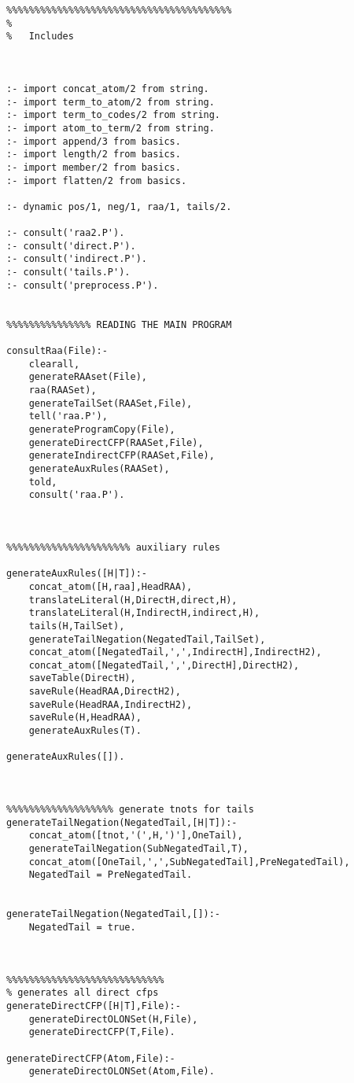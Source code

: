 \begin{verbatim}
%%%%%%%%%%%%%%%%%%%%%%%%%%%%%%%%%%%%%%%%
%
%   Includes 



:- import concat_atom/2 from string.
:- import term_to_atom/2 from string.
:- import term_to_codes/2 from string.
:- import atom_to_term/2 from string.
:- import append/3 from basics.
:- import length/2 from basics.
:- import member/2 from basics.
:- import flatten/2 from basics.

:- dynamic pos/1, neg/1, raa/1, tails/2.

:- consult('raa2.P').
:- consult('direct.P').
:- consult('indirect.P').
:- consult('tails.P').
:- consult('preprocess.P').


%%%%%%%%%%%%%%% READING THE MAIN PROGRAM

consultRaa(File):-
	clearall,
	generateRAAset(File),
	raa(RAASet),
	generateTailSet(RAASet,File),
	tell('raa.P'),
	generateProgramCopy(File),
	generateDirectCFP(RAASet,File),
	generateIndirectCFP(RAASet,File),
	generateAuxRules(RAASet),
	told,
	consult('raa.P').

	

%%%%%%%%%%%%%%%%%%%%%% auxiliary rules

generateAuxRules([H|T]):-
	concat_atom([H,raa],HeadRAA),
	translateLiteral(H,DirectH,direct,H),
	translateLiteral(H,IndirectH,indirect,H),
	tails(H,TailSet),
	generateTailNegation(NegatedTail,TailSet),
	concat_atom([NegatedTail,',',IndirectH],IndirectH2),
	concat_atom([NegatedTail,',',DirectH],DirectH2),
	saveTable(DirectH),
	saveRule(HeadRAA,DirectH2),
	saveRule(HeadRAA,IndirectH2),
	saveRule(H,HeadRAA),
	generateAuxRules(T).
	
generateAuxRules([]).



%%%%%%%%%%%%%%%%%%% generate tnots for tails
generateTailNegation(NegatedTail,[H|T]):-
	concat_atom([tnot,'(',H,')'],OneTail),
	generateTailNegation(SubNegatedTail,T),
	concat_atom([OneTail,',',SubNegatedTail],PreNegatedTail),
	NegatedTail = PreNegatedTail.
		
		
generateTailNegation(NegatedTail,[]):-
	NegatedTail = true.

	

%%%%%%%%%%%%%%%%%%%%%%%%%%%%
% generates all direct cfps	
generateDirectCFP([H|T],File):-
	generateDirectOLONSet(H,File),
	generateDirectCFP(T,File).

generateDirectCFP(Atom,File):-
	generateDirectOLONSet(Atom,File).



\end{verbatim}

